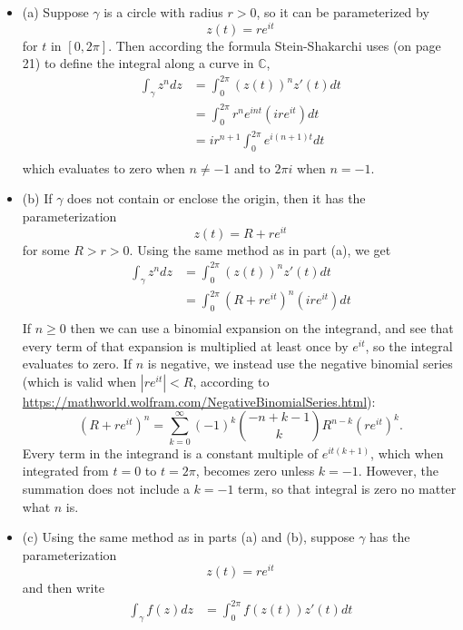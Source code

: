 \documentclass[12pt]{article}
\begin{document}
\begin{itemize}
    \item (a) Suppose $\gamma$ is a circle with radius $r>0$, so it can be parameterized by
        \[ z(t) = re^{it} \]
        for $t$ in $[0, 2 \pi]$. Then according the formula Stein-Shakarchi uses (on page 21) to define the integral along a curve in $\mathbb{C}$,
        \begin{align*}
            \int_\gamma z^n dz &= \int_0^{2 \pi} (z(t))^n z'(t) dt \\
                               &= \int_0^{2 \pi} r^n e^{i n t} (ir e^{it})dt \\
                               &= i r^{n+1} \int_0^{2 \pi} e^{i (n+1) t} dt \\
        \end{align*}
        which evaluates to zero when $n \neq -1$ and to $2 \pi i$ when $n=-1$.
    \item (b) If $\gamma$ does not contain or enclose the origin, then it has the parameterization
        \[ z(t) = R + re^{it} \]
        for some $R > r > 0$. Using the same method as in part (a), we get
        \begin{align*}
            \int_\gamma z^n dz &= \int_0^{2 \pi} (z(t))^n z'(t) dt \\
                               &= \int_0^{2 \pi} (R+re^{it})^n (ir e^{it})dt \\
        \end{align*}
        If $n \geq 0$ then we can use a binomial expansion on the integrand, and see that every term of that expansion is multiplied at least once by $e^{it}$, so the integral evaluates to zero. If $n$ is negative, we instead use the negative binomial series (which is valid when $|re^{it}| < R$, according to \url{https://mathworld.wolfram.com/NegativeBinomialSeries.html}):
        \[ (R+re^{it})^n = \sum_{k=0}^\infty (-1)^k \binom{-n+k-1}{k} R^{n-k} (re^{it})^k. \]
        Every term in the integrand is a constant multiple of $e^{it(k+1)}$, which when integrated from $t=0$ to $t=2 \pi$, becomes zero unless $k=-1$. However, the summation does not include a $k=-1$ term, so that integral is zero no matter what $n$ is.
    \item (c) Using the same method as in parts (a) and (b), suppose $\gamma$ has the parameterization
        \[ z(t) = re^{it} \]
        and then write
        \begin{align*}
            \int_\gamma f(z) dz &= \int_0^{2 \pi} f(z(t)) z'(t) dt \\

\end{align*}
\end{itemize}
\end{document}
